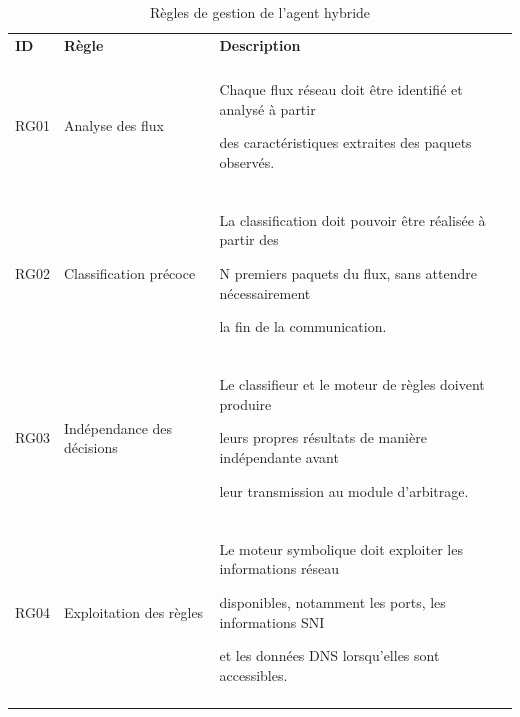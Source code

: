 \begin{table}[H]

\centering

\caption{Règles de gestion de l'agent hybride}

\label{tab:regles-gestion}

\small

\begin{tabularx}{\textwidth}{|p{1.4cm}|p{3.2cm}|Y|}

\hline

\textbf{ID} & \textbf{Règle} & \textbf{Description} \\\\

\hline



RG01 & Analyse des flux &

Chaque flux réseau doit être identifié et analysé à partir

des caractéristiques extraites des paquets observés. \\\\

\hline



RG02 & Classification précoce &

La classification doit pouvoir être réalisée à partir des

N premiers paquets du flux, sans attendre nécessairement

la fin de la communication. \\\\

\hline



RG03 & Indépendance des décisions &

Le classifieur et le moteur de règles doivent produire

leurs propres résultats de manière indépendante avant

leur transmission au module d'arbitrage. \\\\

\hline



RG04 & Exploitation des règles &

Le moteur symbolique doit exploiter les informations réseau

disponibles, notamment les ports, les informations SNI

et les données DNS lorsqu'elles sont accessibles. \\\\


\end{tabularx}
\end{table}
